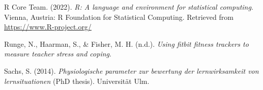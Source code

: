 \documentclass[
  man]{apa6}
\newlength{\cslhangindent}
\newlength{\cslentryspacingunit} %
\newenvironment{CSLReferences}[2] %
 {%
  \setlength{\parindent}{0pt}
  \ifodd #1
  \let\oldpar\par
  \def\par{\hangindent=\cslhangindent\oldpar}
  \fi
  \setlength{\parskip}{#2\cslentryspacingunit}
 }%
 {}
\begin{document}
\begin{CSLReferences}{1}{0}
\leavevmode{}%
R Core Team. (2022). \emph{R: A language and environment for statistical computing}. Vienna, Austria: R Foundation for Statistical Computing. Retrieved from \url{https://www.R-project.org/}

\leavevmode{}%
Runge, N., Haarman, S., \& Fisher, M. H. (n.d.). \emph{Using fitbit fitness trackers to measure teacher stress and coping}.

\leavevmode{}%
Sachs, S. (2014). \emph{Physiologische parameter zur bewertung der lernwirksamkeit von lernsituationen} (PhD thesis). Universit{ä}t Ulm.

\end{CSLReferences}
\end{document}
